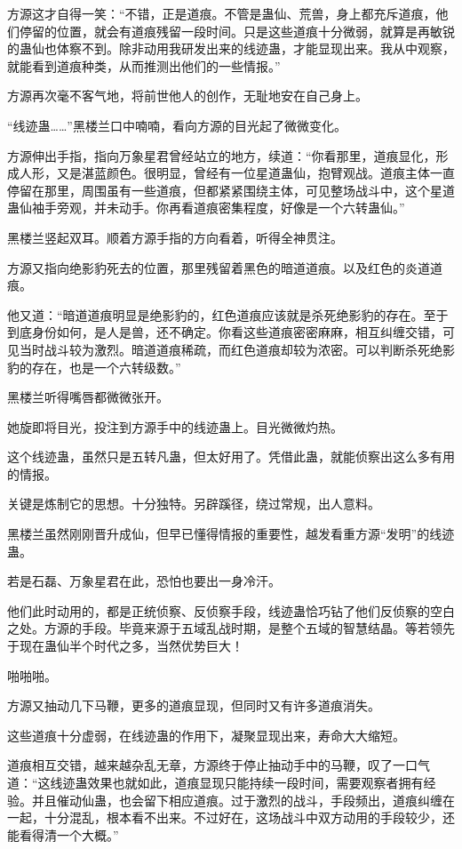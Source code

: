 \begin{this_body}
方源这才自得一笑：“不错，正是道痕。不管是蛊仙、荒兽，身上都充斥道痕，他们停留的位置，就会有道痕残留一段时间。只是这些道痕十分微弱，就算是再敏锐的蛊仙也体察不到。除非动用我研发出来的线迹蛊，才能显现出来。我从中观察，就能看到道痕种类，从而推测出他们的一些情报。”

方源再次毫不客气地，将前世他人的创作，无耻地安在自己身上。

“线迹蛊……”黑楼兰口中喃喃，看向方源的目光起了微微变化。

方源伸出手指，指向万象星君曾经站立的地方，续道：“你看那里，道痕显化，形成人形，又是湛蓝颜色。很明显，曾经有一位星道蛊仙，抱臂观战。道痕主体一直停留在那里，周围虽有一些道痕，但都紧紧围绕主体，可见整场战斗中，这个星道蛊仙袖手旁观，并未动手。你再看道痕密集程度，好像是一个六转蛊仙。”

黑楼兰竖起双耳。顺着方源手指的方向看着，听得全神贯注。

方源又指向绝影豹死去的位置，那里残留着黑色的暗道道痕。以及红色的炎道道痕。

他又道：“暗道道痕明显是绝影豹的，红色道痕应该就是杀死绝影豹的存在。至于到底身份如何，是人是兽，还不确定。你看这些道痕密密麻麻，相互纠缠交错，可见当时战斗较为激烈。暗道道痕稀疏，而红色道痕却较为浓密。可以判断杀死绝影豹的存在，也是一个六转级数。”

黑楼兰听得嘴唇都微微张开。

她旋即将目光，投注到方源手中的线迹蛊上。目光微微灼热。

这个线迹蛊，虽然只是五转凡蛊，但太好用了。凭借此蛊，就能侦察出这么多有用的情报。

关键是炼制它的思想。十分独特。另辟蹊径，绕过常规，出人意料。

黑楼兰虽然刚刚晋升成仙，但早已懂得情报的重要性，越发看重方源“发明”的线迹蛊。

若是石磊、万象星君在此，恐怕也要出一身冷汗。

他们此时动用的，都是正统侦察、反侦察手段，线迹蛊恰巧钻了他们反侦察的空白之处。方源的手段。毕竟来源于五域乱战时期，是整个五域的智慧结晶。等若领先于现在蛊仙半个时代之多，当然优势巨大！

啪啪啪。

方源又抽动几下马鞭，更多的道痕显现，但同时又有许多道痕消失。

这些道痕十分虚弱，在线迹蛊的作用下，凝聚显现出来，寿命大大缩短。

道痕相互交错，越来越杂乱无章，方源终于停止抽动手中的马鞭，叹了一口气道：“这线迹蛊效果也就如此，道痕显现只能持续一段时间，需要观察者拥有经验。并且催动仙蛊，也会留下相应道痕。过于激烈的战斗，手段频出，道痕纠缠在一起，十分混乱，根本看不出来。不过好在，这场战斗中双方动用的手段较少，还能看得清一个大概。”


\end{this_body}
